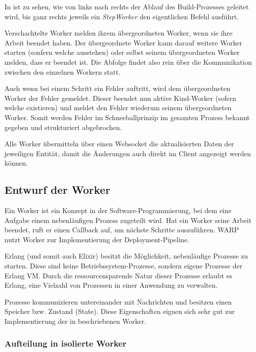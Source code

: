 In  ist zu sehen, wie von links nach rechts der Ablauf des Build-Prozesses geleitet wird, bis ganz rechts jeweils ein \emph{StepWorker} den eigentlichen Befehl ausführt.

Verschachtelte Worker melden ihrem übergeordneten Worker, wenn sie ihre Arbeit beendet haben. Der übergeordnete Worker kann darauf weitere Worker starten (sonfern welche ausstehen) oder selbst seinem übergeordneten Worker melden, dass er beendet ist. Die Abfolge findet also rein über die Kommunikation zwischen den einzelnen Workern statt.

Auch wenn bei einem Schritt ein Fehler auftritt, wird dem übergeordneten Worker der Fehler gemeldet. Dieser beendet nun aktive Kind-Worker (sofern welche existieren) und meldet den Fehler wiederum seinem übergeordneten Worker. Somit werden Fehler im Schneeballprinzip im gesamten Prozess bekannt gegeben und strukturiert abgebrochen.

Alle Worker übermitteln über einen Websocket die aktualisierten Daten der jeweiligen Entität, damit die Änderungen auch direkt im Client angezeigt werden können.

\subsection{Entwurf der Worker}

Ein Worker ist ein Konzept in der Software-Programmierung, bei dem eine Aufgabe einem nebenläufigen Prozess zugeteilt wird. Hat ein Worker seine Arbeit beendet, ruft er einen Callback auf, um nächste Schritte auszuführen. WARP nutzt Worker zur Implementierung der Deployment-Pipeline.

Erlang (und somit auch Elixir) besitzt die Möglichkeit, nebenläufige Prozesse zu starten. Diese sind keine Betriebssystem-Prozesse, sondern eigene Prozesse der Erlang VM. Durch die ressourcensparende Natur dieser Prozesse erlaubt es Erlang, eine Vielzahl von Prozessen in einer Anwendung zu verwalten. \citep[133]{Armstrong2007}

Prozesse kommunizieren untereinander mit Nachrichten und besitzen einen Speicher bzw. Zustand (State). Diese Eigenschaften eignen sich sehr gut zur Implementierung der in  beschriebenen Worker.

\subsubsection{Aufteilung in isolierte Worker}
\label{subsec:aufteilung-der-worker}

